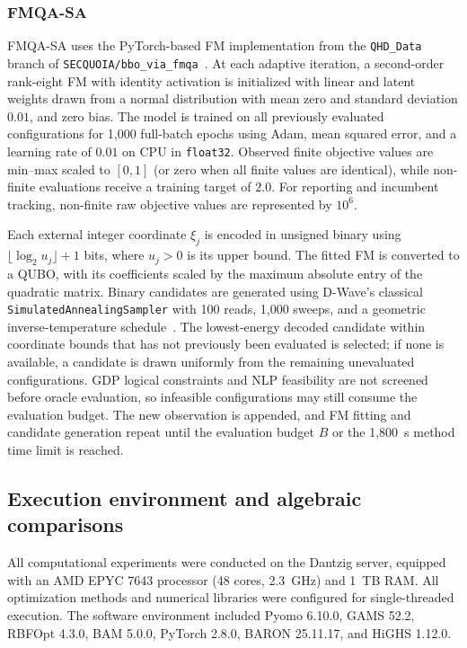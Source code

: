 \documentclass{article}
\begin{document}
\subsubsection{FMQA-SA}
FMQA-SA uses the PyTorch-based FM implementation from the \texttt{QHD\_Data} branch of \nolinkurl{SECQUOIA/bbo_via_fmqa}~\cite{secquoiaBboFmqa}.
At each adaptive iteration, a second-order rank-eight FM with identity activation is initialized with linear and latent weights drawn from a normal distribution with mean zero and standard deviation $0.01$, and zero bias.
The model is trained on all previously evaluated configurations for 1,000 full-batch epochs using Adam, mean squared error, and a learning rate of $0.01$ on CPU in \texttt{float32}.
Observed finite objective values are min--max scaled to $[0,1]$ (or zero when all finite values are identical), while non-finite evaluations receive a training target of $2.0$.
For reporting and incumbent tracking, non-finite raw objective values are represented by $10^6$.

Each external integer coordinate $\xi_j$ is encoded in unsigned binary using $\lfloor\log_2 u_j\rfloor+1$ bits, where $u_j>0$ is its upper bound.
The fitted FM is converted to a QUBO, with its coefficients scaled by the maximum absolute entry of the quadratic matrix.
Binary candidates are generated using D-Wave's classical \texttt{SimulatedAnnealingSampler} with 100 reads, 1,000 sweeps, and a geometric inverse-temperature schedule~\cite{kirkpatrick1983optimization}.
The lowest-energy decoded candidate within coordinate bounds that has not previously been evaluated is selected; if none is available, a candidate is drawn uniformly from the remaining unevaluated configurations.
GDP logical constraints and NLP feasibility are not screened before oracle evaluation, so infeasible configurations may still consume the evaluation budget.
The new observation is appended, and FM fitting and candidate generation repeat until the evaluation budget $B$ or the 1,800~s method time limit is reached.

\subsection{Execution environment and algebraic comparisons}
\label{sec:protocol}
All computational experiments were conducted on the Dantzig server, equipped with an AMD EPYC 7643 processor (48 cores, 2.3~GHz) and 1~TB RAM.
All optimization methods and numerical libraries were configured for single-threaded execution.
The software environment included Pyomo 6.10.0, GAMS 52.2, RBFOpt 4.3.0, BAM 5.0.0, PyTorch 2.8.0, BARON 25.11.17, and HiGHS 1.12.0.
\end{document}
